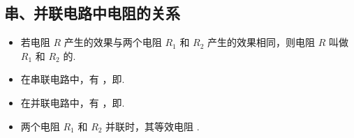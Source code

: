 \subsection{串、并联电路中电阻的关系}
\begin{itemize}
\item 若电阻 $R$ 产生的效果与两个电阻 $R_1$ 和 $R_2$ 产生的效果相同，则电阻 $R$ 叫做 $R_1$ 和 $R_2$ 的.
\item 在串联电路中，有 ，即.
\item 在并联电路中，有 ，即. 
\item 两个电阻 $R_1$ 和 $R_2$ 并联时，其等效电阻 .
\end{itemize}